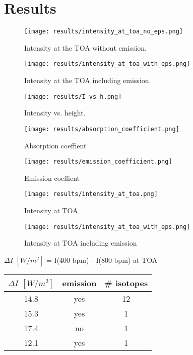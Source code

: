 \section{Results}


\begin{figure}[!ht]
 	\texttt{[image: results/intensity\_at\_toa\_no\_eps.png]}
	\caption{Intensity at the TOA without emission.}
	\label{fig:toa1}
\end{figure}

\begin{figure}[!ht]
	\texttt{[image: results/intensity\_at\_toa\_with\_eps.png]}
	\caption{Intensity at the TOA including emission.}
	\label{fig:toa2}
\end{figure}

\begin{figure}[!ht]
	\texttt{[image: results/I\_vs\_h.png]}
	\caption{Intensity vs. height.}
	\label{fig:I_vs_h}
\end{figure}

\begin{figure}[!ht]
	\texttt{[image: results/absorption\_coefficient.png]}
	\caption{Absorption coeffient}
	\label{fig:abs_coeff}
\end{figure}

\begin{figure}[!ht]
	\texttt{[image: results/emission\_coefficient.png]}
	\caption{Emission coeffient}
	\label{fig:em_coeff}
\end{figure}

\begin{figure}[!ht]
	\texttt{[image: results/intensity\_at\_toa.png]}
	\caption{Intensity at TOA}
	\label{fig:int_toa1}
\end{figure}

\begin{figure}[!ht]
	\texttt{[image: results/intensity\_at\_toa\_with\_eps.png]}
	\caption{Intensity at TOA including emission}
	\label{fig:int_toa2}
\end{figure}


$\Delta I$ $[W/m^2]$ = I(400 bpm) - I(800 bpm) at TOA

\begin{tabular}{|c |c |c |}
	\hline
	$\Delta I$ $[W/m^2]$ & emission & \# isotopes \\
	\hline
	14.8                                     & yes      &  12         \\
	15.3                                     & yes      &  1          \\
	17.4                                     & no       &  1          \\
	12.1                                     & yes      &  1       \\
	\hline   
\end{tabular}  
